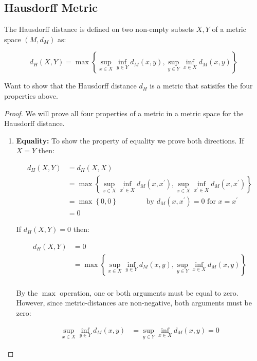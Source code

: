 \documentclass{article}
\begin{document}
\subsection{Hausdorff Metric}

    The Hausdorff distance is defined on two non-empty subsets $X, Y$ of a metric space $(M,d_M)$ as:

    \begin{equation*}
        d_H(X,Y) = \max \left\{ \sup_{x \in X} \inf_{y \in Y} d_M(x,y), \sup_{y \in Y} \inf_{x \in X} d_M(x,y) \right\}
    \end{equation*}

    Want to show that the Hausdorff distance $d_H$ is a metric that satisifes the four properties above.

    \begin{proof}
    We will prove all four properties of a metric in a metric space for the Hausdorff distance.
    
    \begin{enumerate}
    \item \textbf{Equality:}
        To show the property of equality we prove both directions. If $X=Y$ then: 

        \begin{align*}
            d_H(X,Y) &= d_H(X,X) \\
            &= \max \left\{ \sup_{x \in X} \inf_{x^\prime \in X} d_M(x,x^\prime), \sup_{x \in X} \inf_{x^\prime \in X} d_M(x,x^\prime) \right\} \\
            &= \max \left\{ 0, 0 \right\} \qquad \qquad \textrm{by  } d_M(x,x^\prime)=0 \textrm{ for }x=x^\prime\\
            &= 0
        \end{align*}

        If $d_H(X,Y) = 0$ then:

        \begin{align*}
            d_H(X,Y) &= 0 \\
            &= \max \left\{ \sup_{x \in X} \inf_{y \in Y} d_M(x,y), \sup_{y \in Y} \inf_{x \in X} d_M(x,y) \right\} \\
        \end{align*}

        By the $\max$ operation, one or both arguments must be equal to zero. However, since metric-distances are non-negative, both arguments must be zero:

        \begin{align*}
            \sup_{x \in X} \inf_{y \in Y} d_M(x,y) &= \sup_{y \in Y} \inf_{x \in X} d_M(x,y) = 0
        \end{align*}


\end{enumerate}
\end{proof}
\end{document}
